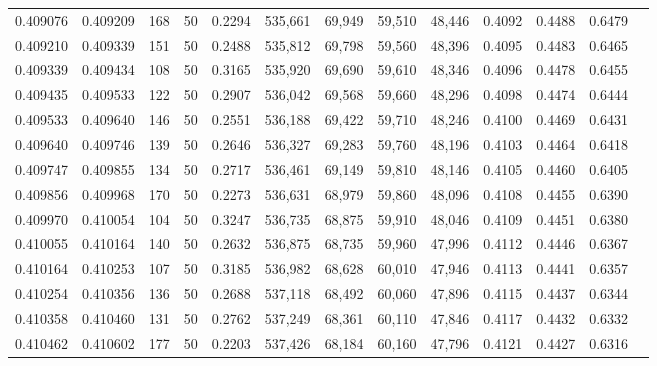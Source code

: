 \begin{tabular}{rrrrrrrrrrrrr}
0.409076 & 0.409209 &   168 &  50 &                                     0.2294 & 535,661 &  69,949 &  59,510 &  48,446 & 0.4092 & 0.4488 & 0.6479 \\
0.409210 & 0.409339 &   151 &  50 &                                     0.2488 & 535,812 &  69,798 &  59,560 &  48,396 & 0.4095 & 0.4483 & 0.6465 \\
0.409339 & 0.409434 &   108 &  50 &                                     0.3165 & 535,920 &  69,690 &  59,610 &  48,346 & 0.4096 & 0.4478 & 0.6455 \\
0.409435 & 0.409533 &   122 &  50 &                                     0.2907 & 536,042 &  69,568 &  59,660 &  48,296 & 0.4098 & 0.4474 & 0.6444 \\
0.409533 & 0.409640 &   146 &  50 &                                     0.2551 & 536,188 &  69,422 &  59,710 &  48,246 & 0.4100 & 0.4469 & 0.6431 \\
0.409640 & 0.409746 &   139 &  50 &                                     0.2646 & 536,327 &  69,283 &  59,760 &  48,196 & 0.4103 & 0.4464 & 0.6418 \\
0.409747 & 0.409855 &   134 &  50 &                                     0.2717 & 536,461 &  69,149 &  59,810 &  48,146 & 0.4105 & 0.4460 & 0.6405 \\
0.409856 & 0.409968 &   170 &  50 &                                     0.2273 & 536,631 &  68,979 &  59,860 &  48,096 & 0.4108 & 0.4455 & 0.6390 \\
0.409970 & 0.410054 &   104 &  50 &                                     0.3247 & 536,735 &  68,875 &  59,910 &  48,046 & 0.4109 & 0.4451 & 0.6380 \\
0.410055 & 0.410164 &   140 &  50 &                                     0.2632 & 536,875 &  68,735 &  59,960 &  47,996 & 0.4112 & 0.4446 & 0.6367 \\
0.410164 & 0.410253 &   107 &  50 &                                     0.3185 & 536,982 &  68,628 &  60,010 &  47,946 & 0.4113 & 0.4441 & 0.6357 \\
0.410254 & 0.410356 &   136 &  50 &                                     0.2688 & 537,118 &  68,492 &  60,060 &  47,896 & 0.4115 & 0.4437 & 0.6344 \\
0.410358 & 0.410460 &   131 &  50 &                                     0.2762 & 537,249 &  68,361 &  60,110 &  47,846 & 0.4117 & 0.4432 & 0.6332 \\
0.410462 & 0.410602 &   177 &  50 &                                     0.2203 & 537,426 &  68,184 &  60,160 &  47,796 & 0.4121 & 0.4427 & 0.6316 \\

\end{tabular}
